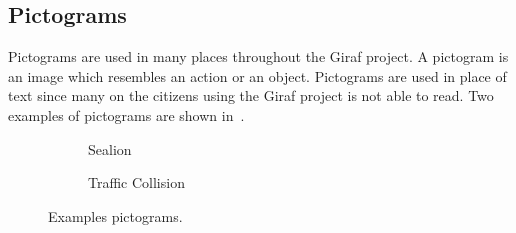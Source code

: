 \subsection{Pictograms}
Pictograms are used in many places throughout the Giraf project.
A pictogram is an image which resembles an action or an object.
Pictograms are used in place of text since many on the citizens using the Giraf project is not able to read.
Two examples of pictograms are shown in~.

\begin{figure}[H]
    \centering
    \begin{subfigure}[b]{0.2\textwidth}
        \caption{Sealion}
        \label{fig:sealion}
    \end{subfigure}
    \qquad
    \begin{subfigure}[b]{0.2\textwidth}
        \caption{Traffic Collision}
        \label{fig:traffic_collision}
    \end{subfigure}
    \caption{Examples pictograms.}\label{fig:pictograms}
\end{figure}

